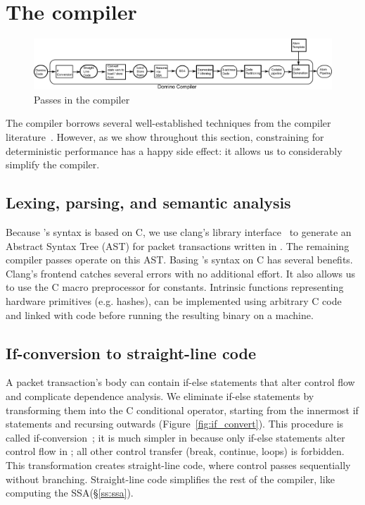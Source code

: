 \section{The \pktlanguage compiler}
\label{s:compiler}

\begin{figure}[!t]
  \includegraphics[width=\textwidth]{compiler.pdf}
  \caption{Passes in the \pktlanguage compiler}
\end{figure}

The \pktlanguage compiler borrows several well-established techniques from the
compiler literature~\cite{muchnik}. However, as we show throughout this
section, constraining \pktlanguage for deterministic performance has a happy
side effect: it allows us to considerably simplify the \pktlanguage compiler.

\subsection{Lexing, parsing, and semantic analysis}
Because \pktlanguage's syntax is based on C, we use clang's library
interface~\cite{libclang} to generate an Abstract Syntax Tree (AST) for packet
transactions written in \pktlanguage. The remaining compiler passes operate on
this AST. Basing \pktlanguage's syntax on C has several benefits.  Clang's
frontend catches several errors with no additional effort. It also
allows us to use the C macro preprocessor for constants. Intrinsic
functions representing hardware primitives (e.g.  hashes), can be
implemented using arbitrary C code and linked with \pktlanguage code before
running the resulting binary on a \absmachine machine.

\subsection{If-conversion to straight-line code}
A packet transaction's body can contain if-else statements that alter control
flow and complicate dependence analysis. We eliminate if-else statements by
transforming them into the C conditional operator, starting from the innermost
if statements and recursing outwards (Figure~\ref{fig:if_convert}). This
procedure is called if-conversion~\cite{if_conversion}; it is much simpler in
\pktlanguage because only if-else statements alter control flow in
\pktlanguage; all other control transfer (break, continue, loops) is forbidden.
This transformation creates straight-line code, where control passes
sequentially without branching. Straight-line code simplifies the rest of the
compiler, like computing the SSA(\S\ref{ss:ssa}).


